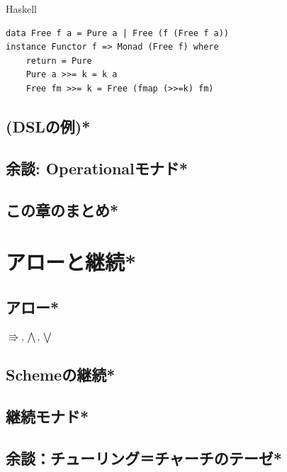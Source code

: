 \documentclass[a4paper,twocolumn]{jsbook}
\newcommand{\programminglanguage}[1]{\textsf{#1}}
\newcommand{\haskell}{\programminglanguage{Haskell}}
\newcommand{\scheme}{\programminglanguage{Scheme}}
\newenvironment{haskellcode}{\begin{itembox}[r]{\haskell}}{\end{itembox}}
\DeclareMathOperator{\mArrow}{\Rrightarrow}
\DeclareMathOperator{\mArrowAnd}{\bigwedge}%
\DeclareMathOperator{\mArrowOr}{\bigvee}%
\begin{document}
\begin{haskellcode}
\begin{verbatim}
data Free f a = Pure a | Free (f (Free f a))
instance Functor f => Monad (Free f) where
    return = Pure
    Pure a >>= k = k a
    Free fm >>= k = Free (fmap (>>=k) fm)
\end{verbatim}
\end{haskellcode}

\section{(DSLの例)*}
\section{余談: Operationalモナド*}
\section{この章のまとめ*}





\chapter{アローと継続*}
\section{アロー*}
$\mArrow,\mArrowAnd,\mArrowOr$
\section{\scheme の継続*}
\section{継続モナド*}
\section{余談：チューリング＝チャーチのテーゼ*}
\end{document}
